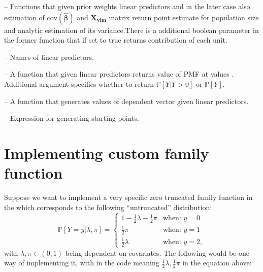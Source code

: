 \documentclass[
]{jss}
\newcommand{\1}{\mathcal{I}} \newcommand{\bZero}{\boldsymbol{0}}
\newcommand{\bbeta}{\boldsymbol{\beta}}
\begin{document}
{  \item {} -- Functions that given prior weights linear predictors and in the later case also estimation of  $\text{cov}(\hat{\bbeta})$ and $\boldsymbol{X_{vlm}}$ matrix return point estimate for population size and analytic estimation of its variance.There is a additional boolean parameter  in the former function that if set to true returns contribution of each unit.
  \item {} -- Names of linear predictors.
  \item {} -- A function that given linear predictors returns value of PMF at values . Additional argument  specifies whether to return $\mathbb{P}[Y|Y>0]$ or $\mathbb{P}[Y]$.
  \item {} -- A function that generates values of dependent  vector given linear predictors.
  \item {} -- Expression for generating starting points.
}

\section[Implementing custom singleRcapture family function]{Implementing
custom  family
function}\label{implementing-custom-family-function}

Suppose we want to implement a very specific zero truncated family
function in the  which corresponds to the following
``untruncated'' distribution: \begin{equation}
  \mathbb{P}[Y=y|\lambda, \pi] = \begin{cases}
    1 - \frac{1}{2}\lambda - \frac{1}{2}\pi & \text{when: } y=0\\
    \frac{1}{2}\pi & \text{when: } y=1\\
    \frac{1}{2}\lambda & \text{when: } y=2,
  \end{cases}
\end{equation} with \(\lambda, \pi\in\left(0, 1\right)\) being dependent
on covariates. The following would be one way of implementing it, with
 in the code meaning
\(\frac{1}{2}\lambda,\frac{1}{2}\pi\) in the equation above:

\footnotesize
\end{document}
